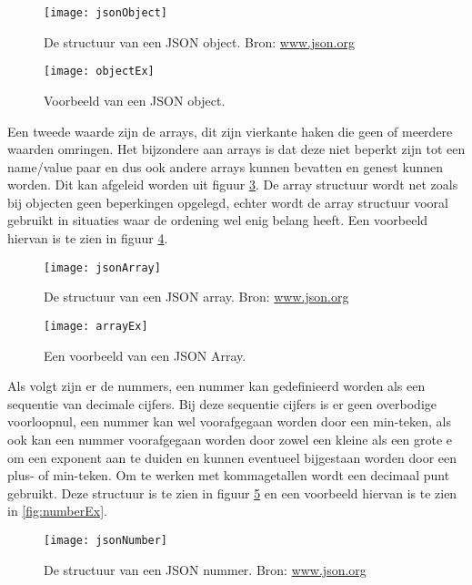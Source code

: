 \begin{figure}[H]
    \centering
\texttt{[image: jsonObject]}
\caption[JSON Object Structuur]{De structuur van een JSON object. Bron: \url{www.json.org}}
    \label{fig:jsonObject}
\end{figure}

\begin{figure}[H]
    \centering
    \texttt{[image: objectEx]}
    \caption[JSON Object]{Voorbeeld van een JSON object.}
    \label{fig:objectEx}
\end{figure}

Een tweede waarde zijn de arrays, dit zijn vierkante haken die geen of meerdere waarden omringen. Het bijzondere aan arrays is dat deze niet beperkt zijn tot een name/value paar en dus ook andere arrays kunnen bevatten en genest kunnen worden. Dit kan afgeleid worden uit figuur \ref{fig:jsonArray}. De array structuur wordt net zoals bij objecten geen beperkingen opgelegd, echter wordt de array structuur vooral gebruikt in situaties waar de ordening wel enig belang heeft. Een voorbeeld hiervan is te zien in figuur \ref{fig:arrayEx}.

\begin{figure}[H]
    \centering
    \texttt{[image: jsonArray]}
    \caption[JSON Array Structuur]{De structuur van een JSON array. Bron: \url{www.json.org}}
    \label{fig:jsonArray}
\end{figure}
\begin{figure}[H]
    \centering
    \texttt{[image: arrayEx]}
    \caption[JSON Array]{Een voorbeeld van een JSON Array.}
    \label{fig:arrayEx}
\end{figure}

Als volgt zijn er de nummers, een nummer kan gedefinieerd worden als een sequentie van decimale cijfers. Bij deze sequentie cijfers is er geen overbodige voorloopnul, een nummer kan wel voorafgegaan worden door een min-teken, als ook kan een nummer voorafgegaan worden door zowel een kleine als een grote e om een exponent aan te duiden en kunnen eventueel bijgestaan worden door een plus- of min-teken. Om te werken met kommagetallen wordt een decimaal punt gebruikt. Deze structuur is te zien in figuur \ref{fig:jsonNumber} en een voorbeeld hiervan is te zien in \ref{fig:numberEx}.

\begin{figure}[H]
    \centering
    \texttt{[image: jsonNumber]}
    \caption[JSON Nummer Structuur]{De structuur van een JSON nummer. Bron: \url{www.json.org}}
    \label{fig:jsonNumber}
\end{figure}

